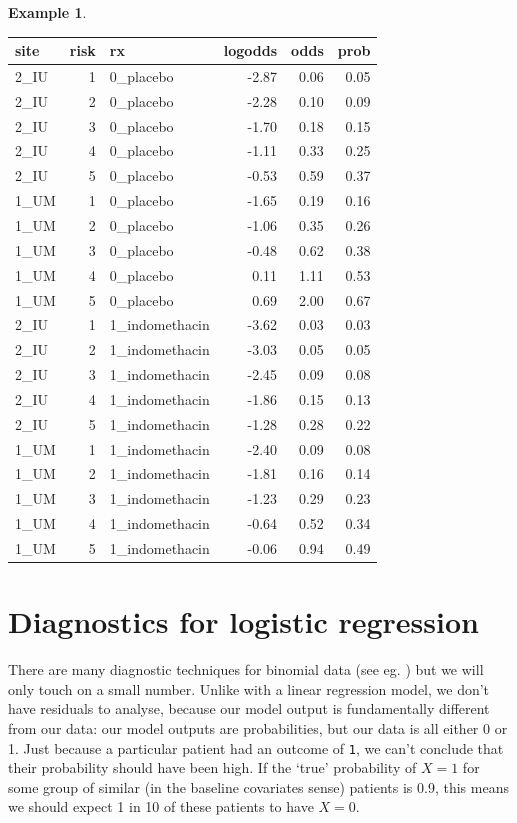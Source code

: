 \documentclass[
  openany]{book}
\theoremstyle{definition}
\theoremstyle{definition}
\newtheorem{example}{Example}[chapter]
\theoremstyle{definition}
\theoremstyle{definition}
\theoremstyle{remark}
\begin{document}
\begin{example}
\begin{tabular}{l|r|l|r|r|r}
\hline
site & risk & rx & logodds & odds & prob\\
\hline
2\_IU & 1 & 0\_placebo & -2.87 & 0.06 & 0.05\\
\hline
2\_IU & 2 & 0\_placebo & -2.28 & 0.10 & 0.09\\
\hline
2\_IU & 3 & 0\_placebo & -1.70 & 0.18 & 0.15\\
\hline
2\_IU & 4 & 0\_placebo & -1.11 & 0.33 & 0.25\\
\hline
2\_IU & 5 & 0\_placebo & -0.53 & 0.59 & 0.37\\
\hline
1\_UM & 1 & 0\_placebo & -1.65 & 0.19 & 0.16\\
\hline
1\_UM & 2 & 0\_placebo & -1.06 & 0.35 & 0.26\\
\hline
1\_UM & 3 & 0\_placebo & -0.48 & 0.62 & 0.38\\
\hline
1\_UM & 4 & 0\_placebo & 0.11 & 1.11 & 0.53\\
\hline
1\_UM & 5 & 0\_placebo & 0.69 & 2.00 & 0.67\\
\hline
2\_IU & 1 & 1\_indomethacin & -3.62 & 0.03 & 0.03\\
\hline
2\_IU & 2 & 1\_indomethacin & -3.03 & 0.05 & 0.05\\
\hline
2\_IU & 3 & 1\_indomethacin & -2.45 & 0.09 & 0.08\\
\hline
2\_IU & 4 & 1\_indomethacin & -1.86 & 0.15 & 0.13\\
\hline
2\_IU & 5 & 1\_indomethacin & -1.28 & 0.28 & 0.22\\
\hline
1\_UM & 1 & 1\_indomethacin & -2.40 & 0.09 & 0.08\\
\hline
1\_UM & 2 & 1\_indomethacin & -1.81 & 0.16 & 0.14\\
\hline
1\_UM & 3 & 1\_indomethacin & -1.23 & 0.29 & 0.23\\
\hline
1\_UM & 4 & 1\_indomethacin & -0.64 & 0.52 & 0.34\\
\hline
1\_UM & 5 & 1\_indomethacin & -0.06 & 0.94 & 0.49\\
\hline
\end{tabular}

\end{example}

\section{Diagnostics for logistic regression}\label{diaglogreg}

There are many diagnostic techniques for binomial data (see eg. \citet{collett_bin}) but we will only touch on a small number. Unlike with a linear regression model, we don't have residuals to analyse, because our model output is fundamentally different from our data: our model outputs are probabilities, but our data is all either 0 or 1. Just because a particular patient had an outcome of \texttt{1}, we can't conclude that their probability should have been high. If the `true' probability of \(X=1\) for some group of similar (in the baseline covariates sense) patients is 0.9, this means we should expect 1 in 10 of these patients to have \(X=0\).
\end{document}
